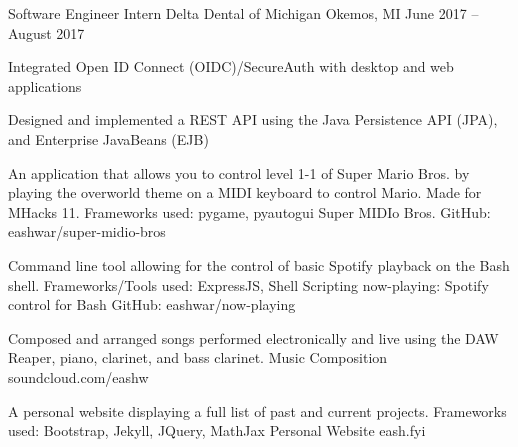 \documentclass[]{awesome-cv}
\begin{document}
	\vspace{-4mm}
	\cventry
	{Software Engineer Intern}
	{Delta Dental of Michigan}
	{Okemos, MI}
	{June 2017 – August 2017}
	{\begin{cvitems}
		\item {Integrated Open ID Connect (OIDC)/SecureAuth with desktop and web applications}
		\item {Designed and implemented a REST API using the Java Persistence API (JPA), and Enterprise JavaBeans (EJB)}
		\end{cvitems}}


\vspace{-5mm}
\vspace{-2mm}

	\cventry
	{An application that allows you to control level 1-1 of Super Mario Bros. by playing the overworld theme on a MIDI keyboard to control Mario. Made for MHacks 11. Frameworks used: pygame, pyautogui}
	{Super MIDIo Bros.}
	{GitHub: eashwar/super-midio-bros}
	{}
	{}

	\vspace{-6mm}
	\cventry
	{Command line tool allowing for the control of basic Spotify playback on the Bash shell. Frameworks/Tools used: ExpressJS, Shell Scripting}
	{now-playing: Spotify control for Bash}
	{GitHub: eashwar/now-playing}
	{}
	{}
	
	\vspace{-6mm}
	\cventry
	{Composed and arranged songs performed electronically and live using the DAW Reaper, piano, clarinet, and bass clarinet.}
	{Music Composition}
	{soundcloud.com/eashw}
	{}
	{}
	
	\vspace{-6mm}
	\cventry
	{A personal website displaying a full list of past and current projects. Frameworks used: Bootstrap, Jekyll, JQuery, MathJax}
	{Personal Website}
	{eash.fyi}
	{}
	{}
	
\end{document}
